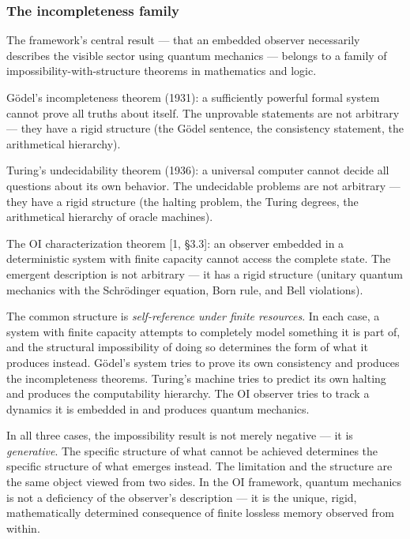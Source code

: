 \documentclass[
  11pt,
]{article}
\begin{document}
\hypertarget{the-incompleteness-family}{%
\subsubsection{The incompleteness
family}\label{the-incompleteness-family}}

The framework's central result --- that an embedded observer necessarily
describes the visible sector using quantum mechanics --- belongs to a
family of impossibility-with-structure theorems in mathematics and
logic.

Gödel's incompleteness theorem (1931): a sufficiently powerful formal
system cannot prove all truths about itself. The unprovable statements
are not arbitrary --- they have a rigid structure (the Gödel sentence,
the consistency statement, the arithmetical hierarchy).

Turing's undecidability theorem (1936): a universal computer cannot
decide all questions about its own behavior. The undecidable problems
are not arbitrary --- they have a rigid structure (the halting problem,
the Turing degrees, the arithmetical hierarchy of oracle machines).

The OI characterization theorem {[}1, §3.3{]}: an observer embedded in a
deterministic system with finite capacity cannot access the complete
state. The emergent description is not arbitrary --- it has a rigid
structure (unitary quantum mechanics with the Schrödinger equation, Born
rule, and Bell violations).

The common structure is \emph{self-reference under finite resources}. In
each case, a system with finite capacity attempts to completely model
something it is part of, and the structural impossibility of doing so
determines the form of what it produces instead. Gödel's system tries to
prove its own consistency and produces the incompleteness theorems.
Turing's machine tries to predict its own halting and produces the
computability hierarchy. The OI observer tries to track a dynamics it is
embedded in and produces quantum mechanics.

In all three cases, the impossibility result is not merely negative ---
it is \emph{generative}. The specific structure of what cannot be
achieved determines the specific structure of what emerges instead. The
limitation and the structure are the same object viewed from two sides.
In the OI framework, quantum mechanics is not a deficiency of the
observer's description --- it is the unique, rigid, mathematically
determined consequence of finite lossless memory observed from within.
\end{document}
